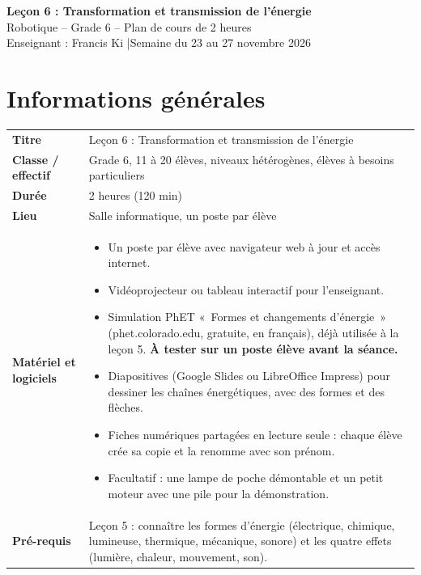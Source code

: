 \documentclass[11pt,a4paper]{article}
\begin{document}
\begin{tcolorbox}[colback=teal!10,colframe=teal!70!black,arc=2mm,boxrule=1pt]
\centering
{\LARGE\bfseries Leçon 6 : Transformation et transmission de l'énergie}\\[2mm]
{\large Robotique -- Grade 6 -- Plan de cours de 2 heures}\\[1mm]
Enseignant : Francis Ki \quad|\quad Semaine du 23 au 27 novembre 2026
\end{tcolorbox}

\section{Informations générales}
\begin{tabularx}{\linewidth}{>{\bfseries}p{3.6cm}Y}
\toprule
Titre & Leçon 6 : Transformation et transmission de l'énergie\\
Classe / effectif & Grade 6, 11 à 20 élèves, niveaux hétérogènes, élèves à besoins particuliers\\
Durée & 2 heures (120 min)\\
Lieu & Salle informatique, un poste par élève\\
Matériel et logiciels &
\begin{itemize}
 \item Un poste par élève avec navigateur web à jour et accès internet.
 \item Vidéoprojecteur ou tableau interactif pour l'enseignant.
 \item Simulation PhET «~Formes et changements d'énergie~» (phet.colorado.edu, gratuite, en français), déjà utilisée à la leçon 5. \textbf{À tester sur un poste élève avant la séance.}
 \item Diapositives (Google Slides ou LibreOffice Impress) pour dessiner les chaînes énergétiques, avec des formes et des flèches.
 \item Fiches numériques partagées en lecture seule : chaque élève crée sa copie et la renomme avec son prénom.
 \item Facultatif : une lampe de poche démontable et un petit moteur avec une pile pour la démonstration.
\end{itemize}\\
Pré-requis &
Leçon 5 : connaître les formes d'énergie (électrique, chimique, lumineuse, thermique, mécanique, sonore) et les quatre effets (lumière, chaleur, mouvement, son).\\
\bottomrule
\end{tabularx}
\end{document}

